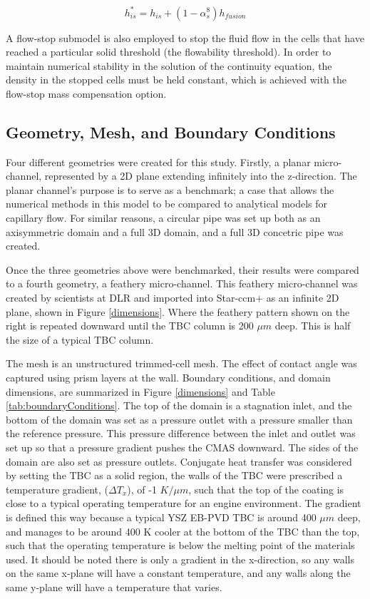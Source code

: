 \documentclass{UCF_ETD}
\begin{document}
\begin{equation}
    h_{is}^{*} = h_{is} + \left( 1 - \alpha_{s}^{8}\right)h_{fusion}
\end{equation}

\noindent A flow-stop submodel is also employed to stop the fluid flow in the cells that have reached a particular solid threshold (the flowability threshold). In order to maintain numerical stability in the solution of the continuity equation, the density in the stopped cells must be held constant, which is achieved with the flow-stop mass compensation option.  

\subsection{Geometry, Mesh, and Boundary Conditions}

Four different geometries were created for this study. Firstly, a planar micro-channel, represented by a 2D plane extending infinitely into the z-direction. The planar channel's purpose is to serve as a benchmark; a case that allows the numerical methods in this model to be compared to analytical models for capillary flow. For similar reasons, a circular pipe was set up both as an axisymmetric domain and a full 3D domain, and a full 3D concetric pipe was created. 

Once the three geometries above were benchmarked, their results were compared to a fourth geometry, a feathery micro-channel. This feathery micro-channel was created by scientists at DLR \cite{Sirigiri2018} and imported into Star-ccm+ as an infinite 2D plane, shown in Figure \ref{dimensions}. Where the feathery pattern shown on the right is repeated downward until the TBC column is 200 $\mu m$ deep. This is half the size of a typical TBC column. 

The mesh is an unstructured trimmed-cell mesh. The effect of contact angle was captured using prism layers at the wall. Boundary conditions, and domain dimensions, are summarized in Figure \ref{dimensions} and Table \ref{tab:boundaryConditions}. The top of the domain is a stagnation inlet, and the bottom of the domain was set as a pressure outlet with a pressure smaller than the reference pressure. This pressure difference between the inlet and outlet was set up so that a pressure gradient pushes the CMAS downward. The sides of the domain are also set as pressure outlets. Conjugate heat transfer was considered by setting the TBC as a solid region, the walls of the TBC were prescribed a temperature gradient, ($\Delta T_{x}$), of -1 $K/\mu m$, such that the top of the coating is close to a typical operating temperature for an engine environment. The gradient is defined this way because a typical YSZ EB-PVD TBC is around 400 $\mu m$ deep, and manages to be around 400 K cooler at the bottom of the TBC than the top, such that the operating temperature is below the melting point of the materials used. It should be noted there is only a gradient in the x-direction, so any walls on the same x-plane will have a constant temperature, and any walls along the same y-plane will have a temperature that varies.
\end{document}
